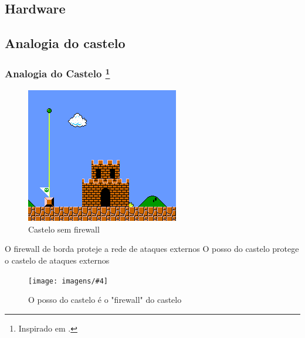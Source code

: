 
\subsection{Hardware}







\subsection{Analogia do castelo}

\begin{frame}
	\frametitle{Analogia do Castelo \footnote{Inspirado em \cite{talal}.}}

	\begin{figure}
		\centering
		\includegraphics[height=.75\textheight]{imagens/castelo-mario.png}
		\caption{Castelo sem firewall}
	\end{figure}

\end{frame}

\newcommand{\analogia}[5][height=.5\textheight]{
	\begin{frame}
	\begin{block}{#2}
		#3
		\begin{figure}
			\centering
			\texttt{[image: imagens/\#4]}
			\caption{#5}
		\end{figure}
	\end{block}
	\end{frame}
}
\analogia	{O firewall de borda proteje a rede de ataques externos}
		{O posso do castelo protege o castelo de ataques externos}
		{castelo.jpg}
		{O posso do castelo é o "firewall" do castelo}

